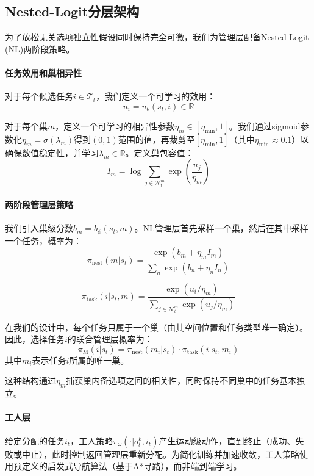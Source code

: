 \documentclass[12pt,a4paper]{article}
\begin{document}
\subsection{Nested-Logit分层架构}

为了放松无关选项独立性假设同时保持完全可微，我们为管理层配备Nested-Logit (NL)两阶段策略。

\paragraph{任务效用和巢相异性}

对于每个候选任务$i \in \mathcal{T}_t$，我们定义一个可学习的效用：
\[u_i = u_\theta(s_t, i) \in \mathbb{R}\]

对于每个巢$m$，定义一个可学习的相异性参数$\eta_m \in [\eta_{\min}, 1]$。我们通过sigmoid参数化$\eta_m = \sigma(\lambda_m)$得到$(0,1)$范围的值，再裁剪至$[\eta_{\min}, 1]$（其中$\eta_{\min} \approx 0.1$）以确保数值稳定性，并学习$\lambda_m \in \mathbb{R}$。定义巢包容值：
\[I_m = \log \sum_{j \in \mathcal{N}^m_t} \exp\left(\frac{u_j}{\eta_m}\right)\]

\paragraph{两阶段管理层策略}

我们引入巢级分数$b_m = b_\phi(s_t, m)$。NL管理层首先采样一个巢，然后在其中采样一个任务，概率为：
\[\pi_{\mathrm{nest}}(m | s_t) = \frac{\exp(b_m + \eta_m I_m)}{\sum_n \exp(b_n + \eta_n I_n)}\]

\[\pi_{\mathrm{task}}(i | s_t, m) = \frac{\exp(u_i / \eta_m)}{\sum_{j \in \mathcal{N}^m_t} \exp(u_j / \eta_m)}\]

在我们的设计中，每个任务只属于一个巢（由其空间位置和任务类型唯一确定）。因此，选择任务$i$的联合管理层概率为：
\[\pi_{\mathrm{M}}(i | s_t) = \pi_{\mathrm{nest}}(m_i | s_t) \cdot \pi_{\mathrm{task}}(i | s_t, m_i)\]
其中$m_i$表示任务$i$所属的唯一巢。

这种结构通过$\eta_m$捕获巢内备选项之间的相关性，同时保持不同巢中的任务基本独立。

\paragraph{工人层}

给定分配的任务$i_t$，工人策略$\pi_\omega(\cdot | o^k_t, i_t)$产生运动级动作，直到终止（成功、失败或中止），此时控制返回管理层重新分配。为简化训练并加速收敛，工人策略使用预定义的启发式导航算法（基于A*寻路），而非端到端学习。
\end{document}

